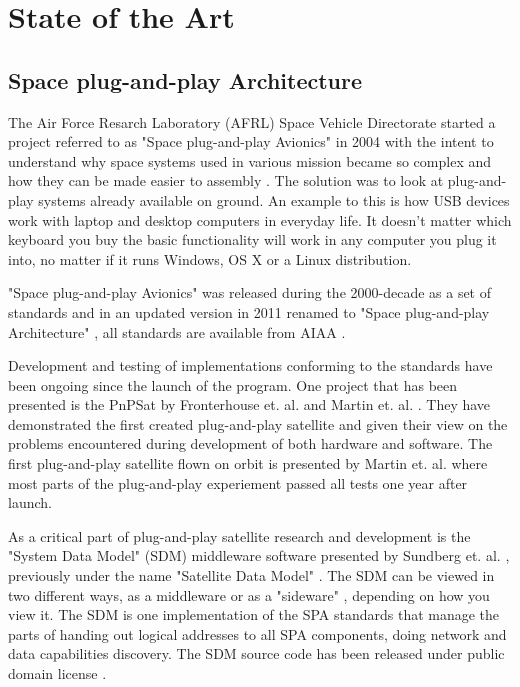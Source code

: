 \chapter{State of the Art} \label{ch:state_of_the_art}

\section{Space plug-and-play Architecture}
The Air Force Resarch Laboratory (AFRL) Space Vehicle Directorate started a
project referred to as "Space plug-and-play Avionics" in 2004 with the intent
to understand why space systems used in various mission became so complex and
how they can be made easier to assembly \cite{fronterhouse2007, martin2012}.
The solution was to look at plug-and-play systems already available on ground.
An example to this is how USB devices work with laptop and desktop computers in
everyday life. It doesn't matter which keyboard you buy the basic functionality
will work in any computer you plug it into, no matter if it runs Windows, OS X
or a Linux distribution.

"Space plug-and-play Avionics" was released during the 2000-decade as a set of
standards and in an updated version in 2011 renamed to "Space plug-and-play
Architecture" \cite{martin2012}, all standards are available from AIAA
\cite{spa:all}.


Development and testing of implementations conforming to the standards have
been ongoing since the launch of the program. One project that has been
presented is the PnPSat by Fronterhouse et. al. \cite{fronterhouse2007} and
Martin et. al. \cite{martin2008}. They have demonstrated the first created
plug-and-play satellite and given their view on the problems encountered during
development of both hardware and software. The first plug-and-play satellite
flown on orbit is presented by Martin et. al. \cite{martin2012} where most
parts of the plug-and-play experiement passed all tests one year after launch.

As a critical part of plug-and-play satellite research and development is the
"System Data Model" (SDM) middleware software presented by Sundberg et. al.
\cite{sundberg2006}, previously under the name "Satellite Data Model"
\cite{spa:sdm-source}. The SDM can be viewed in two different ways, as a
middleware or as a "sideware" \cite{fronterhouse2007}, depending on how you
view it. The SDM is one implementation of the SPA standards that manage the
parts of handing out logical addresses to all SPA components, doing network and
data capabilities discovery. The SDM source code has been released under public
domain license \cite{spa:sdm-source}.

